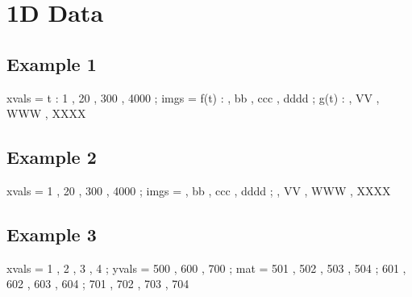 \documentclass[12pt]{article}
\begin{document}


\section{1D Data}

\subsection{Example 1}

\begin{functable}
    xvals =    t : 1 , 20 , 300 , 4000 ;
    imgs  = f(t) :  , bb , ccc , dddd ;
            g(t) :  , VV , WWW , XXXX
\end{functable}


\newpage
\subsection{Example 2}

\begin{functable}
    xvals = 1 , 20 , 300 , 4000 ;
    imgs  =  , bb , ccc , dddd ;
             , VV , WWW , XXXX
\end{functable}


\newpage
\subsection{Example 3}

\begin{functable}
    xvals = 1  , 2  , 3  , 4 ;
    yvals = 500 , 600 , 700 ;
    mat   = 501 , 502 , 503 , 504 ;
            601 , 602 , 603 , 604 ;
            701 , 702 , 703 , 704 
\end{functable}


%


%
%
%
\end{document}

